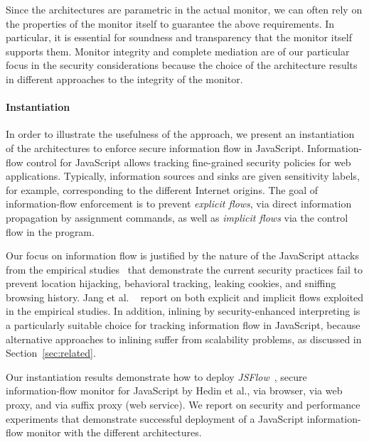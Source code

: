 \documentclass{llncs}
\begin{document}
Since the architectures are parametric in the actual monitor, we can
often rely on the properties of the monitor itself to guarantee the
above requirements. In particular, it is essential for soundness and
transparency that the monitor itself supports them. Monitor integrity
and complete mediation are of our particular focus in the security
considerations because the choice of the architecture results in
different approaches to the integrity of the monitor.

\paragraph{Instantiation}
In order to illustrate the usefulness of the approach, we present an
instantiation of the architectures to enforce secure information flow
in JavaScript. Information-flow control for JavaScript allows tracking
fine-grained security policies for web applications. Typically,
information sources  and sinks are given sensitivity labels, for
example, corresponding to the different Internet origins. The goal of
information-flow enforcement is to prevent \emph{explicit flows}, via
direct information propagation by assignment commands, as well as
\emph{implicit flows} via the control flow in the program.

Our focus on information flow is justified by
the nature of the JavaScript attacks from the empirical
studies~\cite{Jang+:CCS10,Nikiforakis+:CCS12} that demonstrate the current security
practices fail to  prevent 
location
hijacking, behavioral tracking, leaking cookies, and sniffing browsing
history. Jang et al. ~\cite{Jang+:CCS10} report on both explicit and
implicit flows exploited in the empirical studies.
%
In addition, inlining by security-enhanced interpreting is a
particularly suitable choice for tracking information flow in
JavaScript, because alternative approaches to inlining suffer from
scalability problems, as discussed in Section~\ref{sec:related}. 

Our instantiation results demonstrate how to deploy
\emph{JSFlow}~\cite{Hedin:Sabelfeld:CSF12,JSFlow}, secure information-flow
monitor for JavaScript by Hedin et al., via
browser, via web proxy, and via suffix proxy (web service).
%
We report on security and performance experiments that demonstrate successful deployment of a JavaScript
information-flow monitor with the different architectures.


\end{document}
